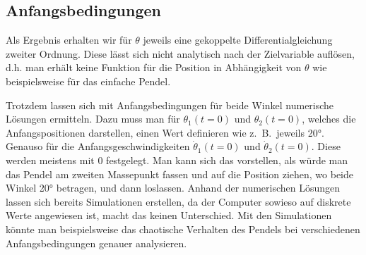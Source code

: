 \subsection{Anfangsbedingungen}
Als Ergebnis erhalten wir für \(\theta\) jeweils eine gekoppelte Differentialgleichung zweiter Ordnung.
Diese lässt sich nicht analytisch nach der Zielvariable auflösen,
d.h. man erhält keine Funktion für die Position in Abhängigkeit von \(\theta\) 
wie beispielsweise für das einfache Pendel.

Trotzdem lassen sich mit Anfangsbedingungen für beide Winkel numerische Lösungen ermitteln.
Dazu muss man für \(\theta_1(t=0)\) und \(\theta_2(t=0)\), welches die Anfangspositionen darstellen,
einen Wert definieren wie z.~B.~jeweils 20°. Genauso für die Anfangsgeschwindigkeiten \(\dot{\theta}_1(t=0)\)
und \(\dot{\theta}_2(t=0)\).
Diese werden meistens mit 0 festgelegt. Man kann sich das vorstellen, als würde man das Pendel
am zweiten Massepunkt fassen und auf die Position ziehen, wo beide Winkel 20° betragen, und dann loslassen.
Anhand der numerischen Lösungen lassen sich bereits Simulationen erstellen, da der Computer
sowieso auf diskrete Werte angewiesen ist, macht das keinen Unterschied.
Mit den Simulationen könnte man beispielsweise das chaotische Verhalten des Pendels bei verschiedenen 
Anfangsbedingungen genauer analysieren.

